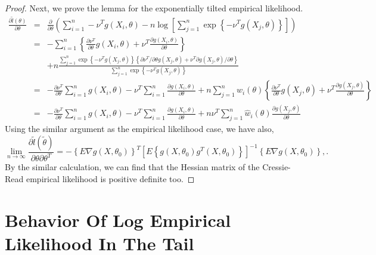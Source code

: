 \begin{proof}
	Next, we prove the lemma for the exponentially tilted empirical likelihood.
	\begin{eqnarray*}
		\frac{\partial\tilde{l}\left(\theta\right)}{\partial\theta}	&=&	\frac{\partial}{\partial\theta} \left( \sum_{i=1}^{n}-\nu^{T}g\left(X_{i},\theta\right)-n\log\left[\sum_{j=1}^{n}\exp\left\{ -\nu^{T}g\left(X_{j},\theta\right)\right\} \right] \right) \\
	&=&	-\sum_{i=1}^{n}\left\{ \frac{\partial\nu^{T}}{\partial\theta}g\left(X_{i},\theta\right)+\nu^{T}\frac{\partial g\left(X_{i},\theta\right)}{\partial\theta}\right\} \\
	&	&+n\frac{\sum_{j=1}^{n}\exp\left\{- \nu^{T}g\left(X_{j},\theta\right)\right\} \left\{ \partial\nu^{T}/\partial\theta g\left(X_{j},\theta\right)+\nu^{T}\partial g\left(X_{j},\theta\right)/\partial\theta\right\} }{\sum_{j=1}^{n}\exp\left\{ - \nu^{T}g\left(X_{j},\theta\right)\right\} }\\
	&=&	-\frac{\partial\nu^{T}}{\partial\theta}\sum_{i=1}^{n}g\left(X_{i},\theta\right)-\nu^{T}\sum_{i=1}^{n}\frac{\partial g\left(X_{i},\theta\right)}{\partial\theta}+n\sum_{j=1}^{n}\hat{w}_{i}\left(\theta\right)\left\{ \frac{\partial\nu^{T}}{\partial\theta}g\left(X_{j},\theta\right)+\nu^{T}\frac{\partial g\left(X_{j},\theta\right)}{\partial\theta}\right\}\\ 
	&=&	-\frac{\partial\nu^{T}}{\partial\theta}\sum_{i=1}^{n}g\left(X_{i},\theta\right)-\nu^{T}\sum_{i=1}^{n}\frac{\partial g\left(X_{i},\theta\right)}{\partial\theta}+n\nu^{T}\sum_{j=1}^{n}\hat{w}_{i}\left(\theta\right)\frac{\partial g\left(X_{j},\theta\right)}{\partial\theta}
	\end{eqnarray*}
	Using the similar argument as the empirical likelihood case, we have also,
	\[
\lim_{n\rightarrow\infty} \frac{\partial\tilde{l}\left(\tilde{\theta}\right)}{\partial\theta\partial\theta^{T}} = -\left\{E\nabla g (X,\theta_0) \right\}^T \left[E\left\{g (X,\theta_0)g^T (X,\theta_0)\right\}\right]^{-1} \left\{E\nabla g (X,\theta_0)\right\},.
\]
	By the similar calculation, we can find that the Hessian matrix of the Cressie-Read empirical likelihood is positive definite too.
	
\end{proof}
\section{Behavior Of Log Empirical Likelihood In  The Tail}

